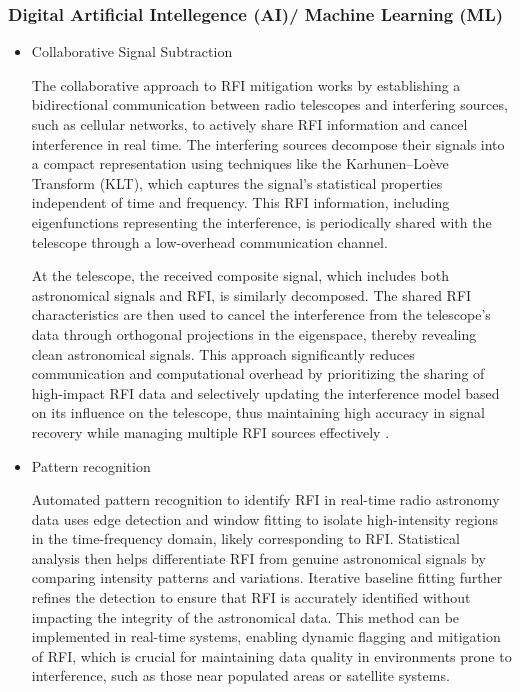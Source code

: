 \subsubsection{Digital Artificial Intellegence (AI)/ Machine Learning (ML)}
\begin{itemize}
\item Collaborative Signal Subtraction

The collaborative approach to RFI mitigation works by establishing a bidirectional communication between radio telescopes and interfering sources, such as cellular networks, to actively share RFI information and cancel interference in real time. The interfering sources decompose their signals into a compact representation using techniques like the Karhunen–Loève Transform (KLT), which captures the signal's statistical properties independent of time and frequency. This RFI information, including eigenfunctions representing the interference, is periodically shared with the telescope through a low-overhead communication channel.

At the telescope, the received composite signal, which includes both astronomical signals and RFI, is similarly decomposed. The shared RFI characteristics are then used to cancel the interference from the telescope’s data through orthogonal projections in the eigenspace, thereby revealing clean astronomical signals. This approach significantly reduces communication and computational overhead by prioritizing the sharing of high-impact RFI data and selectively updating the interference model based on its influence on the telescope, thus maintaining high accuracy in signal recovery while managing multiple RFI sources effectively \citep{chakraborty2023collaboration,chakraborty2024low}.

\item Pattern recognition

Automated pattern recognition to identify RFI in real-time radio astronomy data \citep{Winkel_2007} uses edge detection and window fitting to isolate high-intensity regions in the time-frequency domain, likely corresponding to RFI. Statistical analysis then helps differentiate RFI from genuine astronomical signals by comparing intensity patterns and variations. Iterative baseline fitting further refines the detection to ensure that RFI is accurately identified without impacting the integrity of the astronomical data. This method can be implemented in real-time systems, enabling dynamic flagging and mitigation of RFI, which is crucial for maintaining data quality in environments prone to interference, such as those near populated areas or satellite systems.


\end{itemize}
